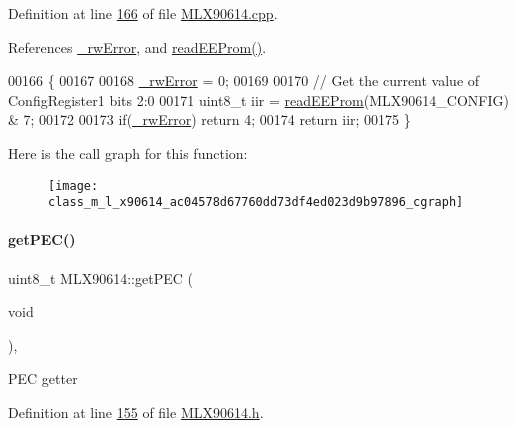 Definition at line \mbox{\hyperlink{_m_l_x90614_8cpp_source_l00166}{166}} of file \mbox{\hyperlink{_m_l_x90614_8cpp_source}{M\+L\+X90614.\+cpp}}.



References \mbox{\hyperlink{_m_l_x90614_8h_source_l00146}{\+\_\+rw\+Error}}, and \mbox{\hyperlink{_m_l_x90614_8cpp_source_l00344}{read\+E\+E\+Prom()}}.


\begin{DoxyCode}
00166                                   \{
00167 
00168     \mbox{\hyperlink{class_m_l_x90614_a8c203cc9359c283d07682ba7dbcc5de3}{\_rwError}} = 0;
00169 
00170     \textcolor{comment}{// Get the current value of ConfigRegister1 bits 2:0}
00171     uint8\_t iir = \mbox{\hyperlink{class_m_l_x90614_aab0a010875527f4ac3d2794017624b10}{readEEProm}}(MLX90614\_CONFIG) & 7;
00172 
00173     \textcolor{keywordflow}{if}(\mbox{\hyperlink{class_m_l_x90614_a8c203cc9359c283d07682ba7dbcc5de3}{\_rwError}}) \textcolor{keywordflow}{return} 4;
00174     \textcolor{keywordflow}{return} iir;
00175 \}
\end{DoxyCode}
Here is the call graph for this function\+:\nopagebreak
\begin{figure}[H]
\begin{center}
\leavevmode
\texttt{[image: class\_m\_l\_x90614\_ac04578d67760dd73df4ed023d9b97896\_cgraph]}
\end{center}
\end{figure}
\mbox{\label{class_m_l_x90614_a7bd321c53f70f4f3a96f7c6c7d4cb80e}} 
\paragraph{\texorpdfstring{get\+P\+E\+C()}{getPEC()}}
{\footnotesize\ttfamily uint8\+\_\+t M\+L\+X90614\+::get\+P\+EC (\begin{DoxyParamCaption}\item[{void}]{ }\end{DoxyParamCaption})\hspace{0.3cm}{\ttfamily [inline]}, {\ttfamily [private]}}

P\+EC getter 

Definition at line \mbox{\hyperlink{_m_l_x90614_8h_source_l00155}{155}} of file \mbox{\hyperlink{_m_l_x90614_8h_source}{M\+L\+X90614.\+h}}.



